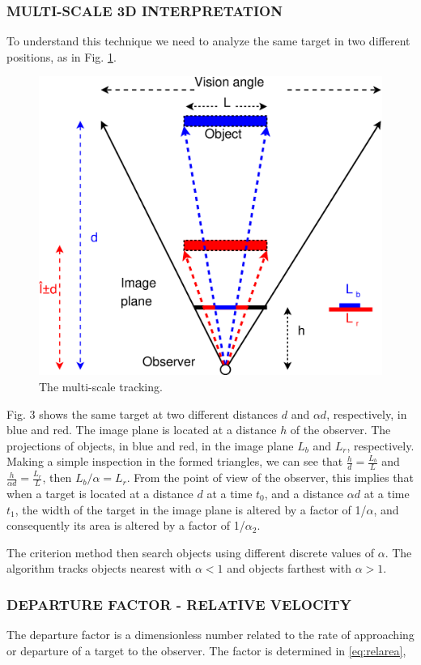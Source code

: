 \subsubsection{MULTI-SCALE 3D INTERPRETATION}
To understand this technique we need to analyze the same target in 
two different positions, as in Fig. \ref{fig:multiscale3d}.

\begin{figure}[H]
\centering
  \includegraphics[width=.7\columnwidth]{images/Diagrama3.eps}
  \caption{The multi-scale tracking.}
  \label{fig:multiscale3d}
\end{figure}
Fig. 3 shows the same target at two different distances $d$ and $\alpha d$, respectively, in blue and red.
The image plane is located at a distance $h$ of the observer.
The projections of objects, in blue and red, in the image plane
$L_b$ and $L_r$, respectively. Making a simple inspection in the
formed triangles, we can see that $\frac{h}{d}=\frac{L_b}{L}$ and 
$\frac{h}{\alpha d}=\frac{L_r}{L}$, then $L_b/\alpha= L_r$. 
From the point of view of the observer, this implies that when a target 
is located at a distance $d$ at a time $t_0$,  and a distance $\alpha d$ at a time $t_1$, 
the width of the target in the image plane is altered by a factor of 1/$\alpha$, and consequently its area is altered by a factor of 1/$\alpha_2$.

The criterion method then search objects using different discrete values of $\alpha$. 
The algorithm tracks objects nearest with $\alpha<1$ and objects farthest with $\alpha>1$.


\subsubsection{DEPARTURE FACTOR - RELATIVE VELOCITY}
The departure factor is a dimensionless number related to the rate of approaching 
or departure of a target to the observer. The factor
is determined in \ref{eq:relarea},


